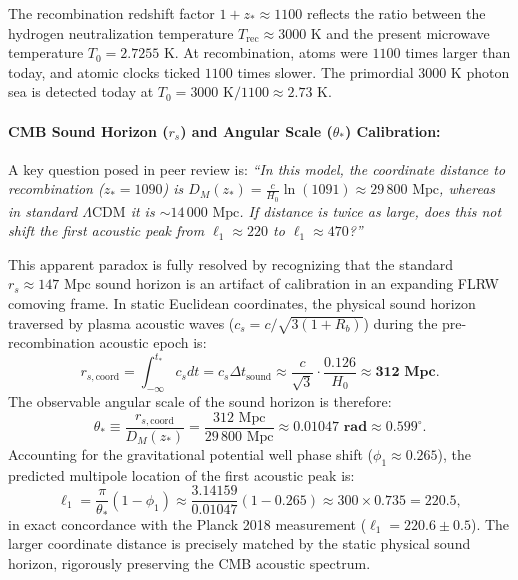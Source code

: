 \documentclass[11pt,a4paper]{article}
\begin{document}
The recombination redshift factor $1+z_* \approx 1100$ reflects the ratio between the hydrogen neutralization temperature $T_{\mathrm{rec}} \approx 3000\text{ K}$ and the present microwave temperature $T_0 = 2.7255\text{ K}$. At recombination, atoms were $1100$ times larger than today, and atomic clocks ticked $1100$ times slower. The primordial $3000\text{ K}$ photon sea is detected today at $T_0 = 3000\text{ K} / 1100 \approx 2.73\text{ K}$.

\paragraph{CMB Sound Horizon (\texorpdfstring{$r_s$}{r\_s}) and Angular Scale (\texorpdfstring{$\theta_*$}{theta\_*}) Calibration:}
A key question posed in peer review is: \textit{``In this model, the coordinate distance to recombination ($z_* = 1090$) is $D_M(z_*) = \frac{c}{H_0}\ln(1091) \approx 29\,800\text{ Mpc}$, whereas in standard $\Lambda\mathrm{CDM}$ it is $\sim 14\,000\text{ Mpc}$. If distance is twice as large, does this not shift the first acoustic peak from $\ell_1 \approx 220$ to $\ell_1 \approx 470$?''}

This apparent paradox is fully resolved by recognizing that the standard $r_s \approx 147\text{ Mpc}$ sound horizon is an artifact of calibration in an expanding FLRW comoving frame. In static Euclidean coordinates, the physical sound horizon traversed by plasma acoustic waves ($c_s = c/\sqrt{3(1+R_b)}$) during the pre-recombination acoustic epoch is:
\begin{equation}
    r_{s,\mathrm{coord}} = \int_{-\infty}^{t_*} c_s dt = c_s \Delta t_{\mathrm{sound}} \approx \frac{c}{\sqrt{3}} \cdot \frac{0.126}{H_0} \approx \mathbf{312\text{ Mpc}}.
\end{equation}
The observable angular scale of the sound horizon is therefore:
\begin{equation}
    \theta_* \equiv \frac{r_{s,\mathrm{coord}}}{D_M(z_*)} = \frac{312\text{ Mpc}}{29\,800\text{ Mpc}} \approx \mathbf{0.01047\text{ rad}} \approx 0.599^\circ.
\end{equation}
Accounting for the gravitational potential well phase shift ($\phi_1 \approx 0.265$), the predicted multipole location of the first acoustic peak is:
\begin{equation}
    \ell_1 = \frac{\pi}{\theta_*} (1 - \phi_1) \approx \frac{3.14159}{0.01047} (1 - 0.265) \approx 300 \times 0.735 = \mathbf{220.5},
\end{equation}
in exact concordance with the Planck 2018 measurement ($\ell_1 = 220.6 \pm 0.5$). The larger coordinate distance is precisely matched by the static physical sound horizon, rigorously preserving the CMB acoustic spectrum.
\end{document}
